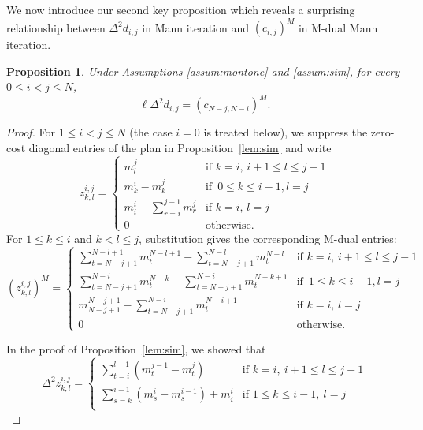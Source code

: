 \documentclass[pdflatex,sn-mathphys-num]{sn-jnl}%
\theoremstyle{thmstyleone}%
\newtheorem{proposition}[theorem]{Proposition}%
\theoremstyle{thmstyletwo}%
\theoremstyle{thmstylethree}%
\begin{document}
 
We now introduce our second key proposition which reveals a surprising relationship between $\Delta^2 d_{i,j}$ in Mann iteration and $(c_{i,j})^M$ in M-dual Mann iteration.
\begin{proposition}\label{lem:quad_dual}
Under Assumptions \ref{assum:montone} and \ref{assum:sim}, for every $0\le i<j\le N$, \[\ell\Delta^2 d_{i,j}=(c_{N-j,N-i})^M.\]
\end{proposition}
\begin{proof}
For $1\le i<j\le N$ (the case $i=0$ is treated below), we suppress the zero-cost diagonal entries of the plan in Proposition~\ref{lem:sim} and write
\[
 z^{i,j}_{k,l}
=
\begin{cases}
\displaystyle
m^j_l
&\text{if } k=i,\, i+1 \le l \le j-1\\[10pt]

m^i_k-m^j_k
&\text{if }   \, 0 \le k \le i-1, l=j \\[10pt]

m^i_i-\sum^{j-1}_{r=i}m^j_r
&\text{if }  k=i, \, l=j \\[10pt]

0
& \text{otherwise.}
\end{cases}
\]
For $1\le k\le i$ and $k<l\le j$, substitution gives the
corresponding M-dual entries:
\[
 (z^{i,j}_{k,l})^M
=
\begin{cases}
\displaystyle
\sum^{N-l+1}_{t=N-j+1}m^{N-l+1}_{t} -\sum^{N-l}_{t=N-j+1}m^{N-l}_{t}
&\text{if } k=i,\, i+1 \le l \le j-1\\[10pt]

\sum^{N-i}_{t=N-j+1} m^{N-k}_{t}-\sum^{N-i}_{t=N-j+1} m^{N-k+1}_{t} 
&\text{if }   \, 1 \le k \le i-1, l=j \\[10pt]

m^{N-j+1}_{N-j+1}  - \sum^{N-i}_{t=N-j+1} m^{N-i+1}_{t}
&\text{if }  k=i, \, l=j \\[10pt]

0
& \text{otherwise.}
\end{cases}
\]

In the proof of Proposition~\ref{lem:sim}, we showed that
    \[
\Delta^2 z^{i,j}_{k,l}
=
\begin{cases}
\displaystyle
\sum_{t=i}^{l-1}\left(m^{j-1}_t-m^{j}_t\right)
&\text{if } k=i,\ i+1\le l \le j-1 \\[10pt]


\displaystyle
\sum_{s=k}^{i-1}\left(m^{i}_s-m^{i-1}_s\right)+m^i_i
&\text{if } 1 \le k \le i-1,\ l=j\\[10pt]


\end{cases}\]
\end{proof}
\end{document}
